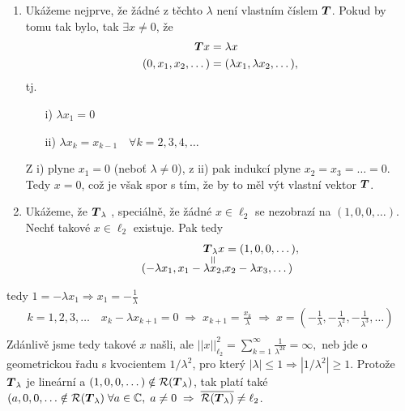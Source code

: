 {\begin{enumerate}
    \item Ukážeme nejprve, že žádné z těchto $\lambda$ není vlastním číslem $\boldsymbol{T}$. Pokud by tomu tak bylo, tak $\exists x\neq0$, že
    \vspace*{-0.5cm}
    \begin{align*}
        \boldsymbol{T} x&=\lambda x\\
        (0,x_1,x_2,\dots)&=(\lambda x_1,\lambda x_2,\dots),
    \end{align*}
    tj.
    \begin{enumerate}
        \item[i)] $\lambda x_1=0$
        \item[ii)] $\lambda x_k=x_{k-1} \quad \forall k=2,3,4,\dots$
    \end{enumerate}
    Z i) plyne $x_1=0$ (neboť $\lambda\neq 0$), z ii) pak indukcí plyne $x_2=x_3=\dots=0$. Tedy $x=0$, což je však spor s tím, že by to měl výt vlastní vektor $\boldsymbol{T}$.
    \item Ukážeme, že $\boldsymbol{T}_\lambda$ , speciálně, že žádné $x\in \ell_2$ se nezobrazí na $(1,0,0,\dots)$. Nechť takové $x\in \ell_2$ existuje. Pak tedy
    \vspace*{-0.5cm}
    \begin{align*}
        \underset{\rotatebox[origin=c]{90}{=}}{\map T_\lambda x} &= (1,0,0,\dots),\\[-7pt]
        (-\lambda x_1,x_1-\lambda x_2,&x_2-\lambda x_3,\dots )
    \end{align*}
\end{enumerate}
\vspace*{-0.5cm}
tedy $1=-\lambda x_1 \Rightarrow x_1=-\frac{1}{\lambda}$
\vspace*{-0.5cm}
\begin{align*}
    k=1,2,3,\dots \quad x_k-\lambda x_{k+1}=0 \;\Rightarrow\; x_{k+1}=\frac{x_k}{\lambda} \;\Rightarrow\; x=\left(-\frac{1}{\lambda},-\frac{1}{\lambda^2},-\frac{1}{\lambda^3},\dots\right)\\
\end{align*}
Zdánlivě jsme tedy takové $x$ našli, ale
 $||x||_{\ell_2}^2=\sum\limits_{k=1}^\infty\frac{1}{\lambda^{2k}}=\infty,$
neb jde o geometrickou řadu s kvocientem $1/\lambda^2$, pro který $|\lambda|\leq 1 \Rightarrow |1/\lambda^2|\geq 1$.
Protože $\boldsymbol{T}_\lambda$ je lineární a $(1,0,0,\dots)\notin \mathcal{R}(\boldsymbol{T}_\lambda)$, tak platí také $(a,0,0,\dots \notin \mathcal{R}(\boldsymbol{T}_\lambda)\; \forall a \in \mathbb{C},\;a\neq0\;\Rightarrow\;\overline{\mathcal{R}(\boldsymbol{T}_\lambda)}\neq \ell_2$.

}
